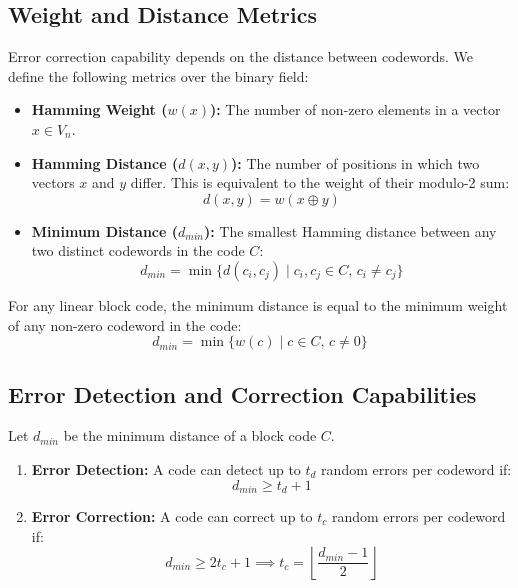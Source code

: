 \documentclass[12pt,a4paper]{article}
\begin{document}
\subsection{Weight and Distance Metrics}
Error correction capability depends on the distance between codewords. We define the following metrics over the binary field:
\begin{tcolorbox}[defbox, title={\textbf{Weight and Distance Definitions}}]
\begin{itemize}[leftmargin=*, itemsep=3pt, topsep=0pt]
  \item \textbf{Hamming Weight ($w(x)$):} The number of non-zero elements in a vector $x \in V_n$.
  \item \textbf{Hamming Distance ($d(x, y)$):} The number of positions in which two vectors $x$ and $y$ differ. This is equivalent to the weight of their modulo-2 sum:
    \[ d(x, y) = w(x \oplus y) \]
  \item \textbf{Minimum Distance ($d_{min}$):} The smallest Hamming distance between any two distinct codewords in the code $C$:
    \[ d_{min} = \min \{ d(c_i, c_j) \mid c_i, c_j \in C, \, c_i \neq c_j \} \]
\end{itemize}
\end{tcolorbox}

For any linear block code, the minimum distance is equal to the minimum weight of any non-zero codeword in the code:
\[ d_{min} = \min \{ w(c) \mid c \in C, \, c \neq 0 \} \]

\subsection{Error Detection and Correction Capabilities}
\begin{tcolorbox}[formulabox, title={\textbf{Error Bounds}}]
Let $d_{min}$ be the minimum distance of a block code $C$.
\begin{enumerate}[leftmargin=*, itemsep=3pt, topsep=0pt]
  \item \textbf{Error Detection:} A code can detect up to $t_d$ random errors per codeword if:
    \[ d_{min} \ge t_d + 1 \]
  \item \textbf{Error Correction:} A code can correct up to $t_c$ random errors per codeword if:
    \[ d_{min} \ge 2t_c + 1 \implies t_c = \left\lfloor \frac{d_{min} - 1}{2} \right\rfloor \]
\end{enumerate}
\end{tcolorbox}

\end{document}
